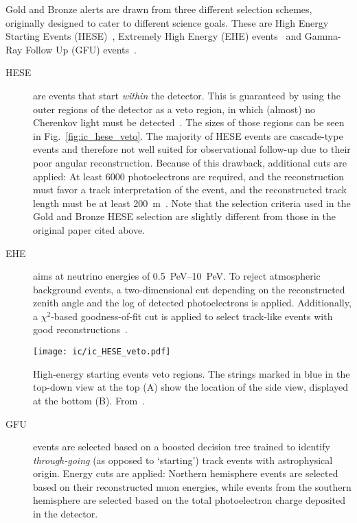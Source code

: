 Gold and Bronze alerts are drawn from three different selection schemes, originally designed to cater to different science goals. These are High Energy Starting Events (HESE)~, Extremely High Energy (EHE) events~ and Gamma-Ray Follow Up (GFU) events~.

\begin{description}

    \item[HESE] are events that start \textit{within} the detector. This is guaranteed by using the outer regions of the detector as a veto region, in which (almost) no Cherenkov light must be detected~\cite{Aartsen2013}. The sizes of those regions can be seen in Fig.~\ref{fig:ic_hese_veto}. The majority of HESE events are cascade-type events and therefore not well suited for observational follow-up due to their poor angular reconstruction. Because of this drawback, additional cuts are applied: At least 6000 photoelectrons are required, and the reconstruction must favor a track interpretation of the event, and the reconstructed track length must be at least \SI{200}{\meter}~\cite{Abbasi2023}. Note that the selection criteria used in the Gold and Bronze HESE selection are slightly different from those in the original paper cited above.

    \item[EHE] aims at neutrino energies of \SIrange{0.5}{10}{\peta\eV}. To reject atmospheric background events, a two-dimensional cut depending on the reconstructed zenith angle and the log of detected photoelectrons is applied. Additionally, a $\chi^2$-based goodness-of-fit cut is applied to select track-like events with good reconstructions~\cite{Abbasi2023}.

          \begin{marginfigure}
              \texttt{[image: ic/ic\_HESE\_veto.pdf]}
              \caption[HESE veto regions]{High-energy starting events veto regions. The strings marked in blue in the top-down view at the top (A) show the location of the side view, displayed at the bottom (B). From~\cite{Aartsen2013}.}
          \end{marginfigure}

    \item[GFU] events are selected based on a boosted decision tree trained to identify \textit{through-going} (as opposed to `starting') track events with astrophysical origin. Energy cuts are applied: Northern hemisphere events are selected based on their reconstructed muon energies, while events from the southern hemisphere are selected based on the total photoelectron charge deposited in the detector.
\end{description}

